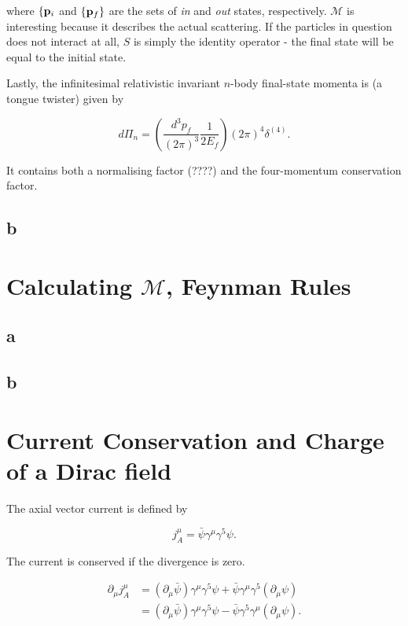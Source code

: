 \documentclass[11pt, a4paper]{amsart}
\begin{document}
where $\{\vb{p}_i$ and $\{\vb{p}_f\}$ are the sets of \emph{in} and \emph{out} states, respectively. $\mathcal{M}$ is interesting because it describes the actual scattering. If the particles in question does not interact at all, $S$ is simply the identity operator - the final state will be equal to the initial state.

Lastly, the infinitesimal relativistic invariant $n$-body final-state momenta is (a tongue twister) given by

\begin{equation}
d\Pi_n = \left(\frac{d^3p_f}{(2\pi)^3} \frac{1}{2E_f}\right) (2\pi)^4 \delta^(4).
\end{equation}

It contains both a normalising factor (????) and the four-momentum conservation factor.

\subsection*{b}

\section{Calculating $\mathcal{M}$, Feynman Rules}

\subsection*{a}

\subsection*{b}

\section{Current Conservation and Charge of a Dirac field}
The axial vector current is defined by

\begin{equation}
j_A^\mu = \bar{\psi} \gamma^\mu \gamma^5 \psi.
\end{equation}

The current is conserved if the divergence is zero.

\begin{align}
\partial_\mu j_A^\mu 
&= (\partial_\mu \bar{\psi} ) \gamma^\mu \gamma^5 \psi + \bar{\psi} \gamma^\mu \gamma^5 (\partial_\mu \psi) \\
&= (\partial_\mu \bar{\psi} ) \gamma^\mu \gamma^5 \psi  - \bar{\psi} \gamma^5 \gamma^\mu (\partial_\mu \psi) \label{eq:current1}.
\end{align}
\end{document}
